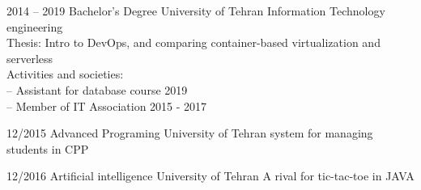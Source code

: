\documentclass[9pt]{developercv}
\begin{document}
\begin{entrylist}
	\entry
	{2014 -- 2019}
	{Bachelor's Degree}
	{University of Tehran}
	{
		Information Technology engineering \\
		Thesis: Intro to DevOps, and comparing container-based virtualization and serverless \\
		Activities and societies: \\
		-- Assistant for database course 2019 \\
		-- Member of IT Association 2015 - 2017 \\
	}
\end{entrylist}




\begin{entrylist}
	\entry
	{12/2015}
	{Advanced Programing}
	{University of Tehran}
	{system for managing students in CPP}
\end{entrylist}
\begin{entrylist}
	\entry
	{12/2016}
	{Artificial intelligence}
	{University of Tehran}
	{A rival for tic-tac-toe in JAVA}
\end{entrylist}
\end{document}
